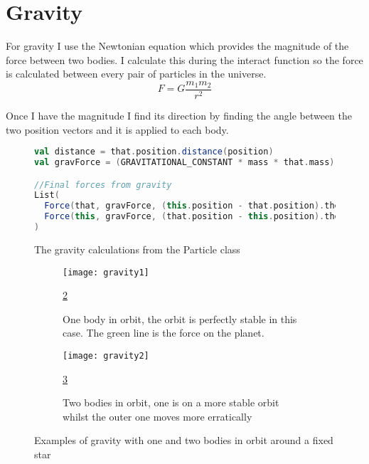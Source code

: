\section{Gravity}
	For gravity I use the Newtonian equation which provides the magnitude of the force between two bodies. I calculate this during the interact function so the force is calculated between every pair of particles in the universe.
	\begin{equation}
		F = G\frac{m_{1}m_{2}}{r^{2}}
	\end{equation}
	
	Once I have the magnitude I find its direction by finding the angle between the two position vectors and it is applied to each body.
	\begin{figure}[h]
		\centering
		\begin{lstlisting}[language=Scala]
val distance = that.position.distance(position)
val gravForce = (GRAVITATIONAL_CONSTANT * mass * that.mass) / Math.pow(distance, 2)

//Final forces from gravity
List(
  Force(that, gravForce, (this.position - that.position).theta),
  Force(this, gravForce, (that.position - this.position).theta)
)
		\end{lstlisting}
		\caption{The gravity calculations from the Particle class}
		\label{fig:gravCode}
	\end{figure}
	
	\begin{figure}[p]
		\centering
		\begin{subfigure}{0.9\textwidth}
			\centering
			\texttt{[image: gravity1]}
			\caption{One body in orbit, the orbit is perfectly stable in this case. The green line is the force on the planet.}
			\label{fig:gravExamplesSub1}
			\ref{fig:gravExamplesSub1}
		\end{subfigure}
		\begin{subfigure}{0.9\textwidth}
			\centering
			\texttt{[image: gravity2]}
			\caption{Two bodies in orbit, one is on a more stable orbit whilst the outer one moves more erratically} 
			\label{fig:gravExamplesSub2}
			\ref{fig:gravExamplesSub2}
		\end{subfigure}	
		\caption{Examples of gravity with one and two bodies in orbit around a fixed star}
		\label{fig:gravExamples}
	\end{figure}